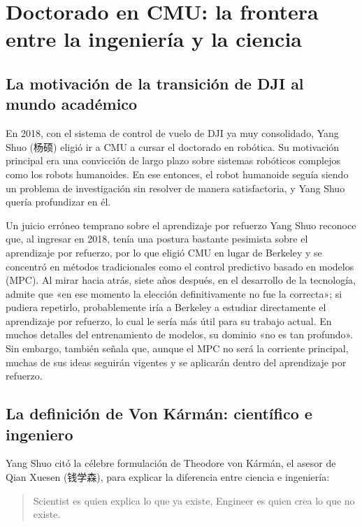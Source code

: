 \section{Doctorado en CMU: la frontera entre la ingeniería y la ciencia}

\subsection{La motivación de la transición de DJI al mundo académico}

En 2018, con el sistema de control de vuelo de DJI ya muy consolidado, Yang Shuo (杨硕) eligió ir a CMU a cursar el doctorado en robótica. Su motivación principal era una convicción de largo plazo sobre sistemas robóticos complejos como los robots humanoides. En ese entonces, el robot humanoide seguía siendo un problema de investigación sin resolver de manera satisfactoria, y Yang Shuo quería profundizar en él.

\begin{warningbox}{Un juicio erróneo temprano sobre el aprendizaje por refuerzo}
Yang Shuo reconoce que, al ingresar en 2018, tenía una postura bastante pesimista sobre el aprendizaje por refuerzo, por lo que eligió CMU en lugar de Berkeley y se concentró en métodos tradicionales como el control predictivo basado en modelos (MPC). Al mirar hacia atrás, siete años después, en el desarrollo de la tecnología, admite que «en ese momento la elección definitivamente no fue la correcta»; si pudiera repetirlo, probablemente iría a Berkeley a estudiar directamente el aprendizaje por refuerzo, lo cual le sería más útil para su trabajo actual. En muchos detalles del entrenamiento de modelos, su dominio «no es tan profundo». Sin embargo, también señala que, aunque el MPC no será la corriente principal, muchas de sus ideas seguirán vigentes y se aplicarán dentro del aprendizaje por refuerzo.
\end{warningbox}

\subsection{La definición de Von Kármán: científico e ingeniero}

Yang Shuo citó la célebre formulación de Theodore von K\'arm\'an, el asesor de Qian Xuesen (钱学森), para explicar la diferencia entre ciencia e ingeniería:

\begin{quote}
Scientist es quien explica lo que ya existe, Engineer es quien crea lo que no existe.
\end{quote}

